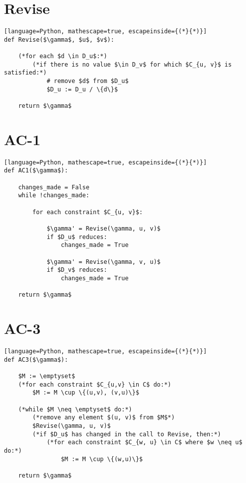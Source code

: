 \documentclass{article}
\begin{document}
\section*{Revise}
\begin{lstlisting}[language=Python, mathescape=true, escapeinside={(*}{*)}]
def Revise($\gamma$, $u$, $v$):

    (*for each $d \in D_u$:*)
        (*if there is no value $\in D_v$ for which $C_{u, v}$ is satisfied:*)
            # remove $d$ from $D_u$
            $D_u := D_u / \{d\}$

    return $\gamma$

\end{lstlisting}

\section*{AC-1}
\begin{lstlisting}[language=Python, mathescape=true, escapeinside={(*}{*)}]
def AC1($\gamma$):

    changes_made = False
    while !changes_made:

        for each constraint $C_{u, v}$:
        
            $\gamma' = Revise(\gamma, u, v)$
            if $D_u$ reduces:
                changes_made = True
            
            $\gamma' = Revise(\gamma, v, u)$
            if $D_v$ reduces:
                changes_made = True

    return $\gamma$

\end{lstlisting}

\section*{AC-3}
\begin{lstlisting}[language=Python, mathescape=true, escapeinside={(*}{*)}]
def AC3($\gamma$):

    $M := \emptyset$
    (*for each constraint $C_{u,v} \in C$ do:*)
        $M := M \cup \{(u,v), (v,u)\}$

    (*while $M \neq \emptyset$ do:*)
        (*remove any element $(u, v)$ from $M$*)
        $Revise(\gamma, u, v)$
        (*if $D_u$ has changed in the call to Revise, then:*)
            (*for each constraint $C_{w, u} \in C$ where $w \neq u$ do:*)
                $M := M \cup \{(w,u)\}$

    return $\gamma$

\end{lstlisting}
\end{document}
